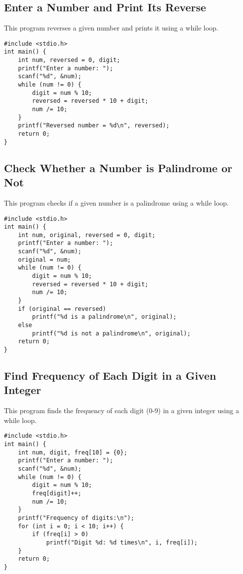 \documentclass[a4paper,12pt]{article}
\begin{document}
\newpage

\subsection{Enter a Number and Print Its Reverse}
This program reverses a given number and prints it using a while loop.

\begin{lstlisting}[caption={Enter a Number and Print Its Reverse}]
#include <stdio.h>
int main() {
    int num, reversed = 0, digit;
    printf("Enter a number: ");
    scanf("%d", &num);
    while (num != 0) {
        digit = num % 10;
        reversed = reversed * 10 + digit;
        num /= 10;
    }
    printf("Reversed number = %d\n", reversed);
    return 0;
}
\end{lstlisting}

\newpage

\subsection{Check Whether a Number is Palindrome or Not}
This program checks if a given number is a palindrome using a while loop.

\begin{lstlisting}[caption={Check Whether a Number is Palindrome or Not}]
#include <stdio.h>
int main() {
    int num, original, reversed = 0, digit;
    printf("Enter a number: ");
    scanf("%d", &num);
    original = num;
    while (num != 0) {
        digit = num % 10;
        reversed = reversed * 10 + digit;
        num /= 10;
    }
    if (original == reversed)
        printf("%d is a palindrome\n", original);
    else
        printf("%d is not a palindrome\n", original);
    return 0;
}
\end{lstlisting}

\newpage

\subsection{Find Frequency of Each Digit in a Given Integer}
This program finds the frequency of each digit (0-9) in a given integer using a while loop.

\begin{lstlisting}[caption={Find Frequency of Each Digit in a Given Integer}]
#include <stdio.h>
int main() {
    int num, digit, freq[10] = {0};
    printf("Enter a number: ");
    scanf("%d", &num);
    while (num != 0) {
        digit = num % 10;
        freq[digit]++;
        num /= 10;
    }
    printf("Frequency of digits:\n");
    for (int i = 0; i < 10; i++) {
        if (freq[i] > 0)
            printf("Digit %d: %d times\n", i, freq[i]);
    }
    return 0;
}
\end{lstlisting}
\end{document}
